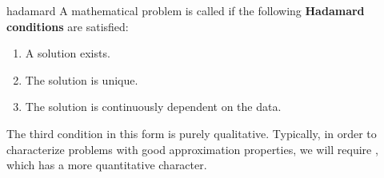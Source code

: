 \begin{Definition}{hadamard} 
  A mathematical problem is called  if the
  following \textbf{Hadamard conditions} are satisfied:
  \begin{enumerate}
  \item A solution exists.
  \item The solution is unique.
  \item The solution is continuously dependent on the data.
  \end{enumerate}
  The third condition in this form is purely qualitative. Typically,
  in order to characterize problems with good approximation
  properties, we will require , which
  has a more quantitative character.
\end{Definition}

